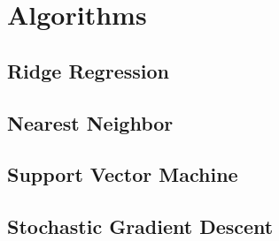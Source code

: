 \section{Algorithms}
\subsection{Ridge Regression}
\subsection{Nearest Neighbor}
\subsection{Support Vector Machine}
\subsection{Stochastic Gradient Descent}
